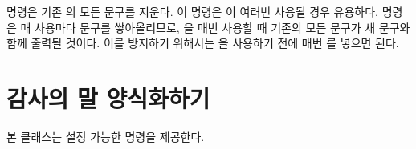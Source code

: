 \cmd{\emptythanks} 명령은 기존 \cmd{\thanks}의 모든 문구를 지운다.
이 명령은 \cmd{\maketitle}이 여러번 사용될 경우 유용하다.
\cmd{\thanks} 명령은 매 사용마다 문구를 쌓아올리므로, \cmd{\maketitle}을 매번
사용할 때 기존의 모든 \cmd{\thanks} 문구가 새 문구와 함께 출력될 것이다.
이를 방지하기 위해서는 \cmd{\maketitle}을 사용하기 전에 매번
\cmd{\emptythanks}를 넣으면 된다.



\section{감사의 말 양식화하기} \label{sec:thanks}



본 클래스는 설정 가능한 \cmd{\thanks} 명령을 제공한다.


